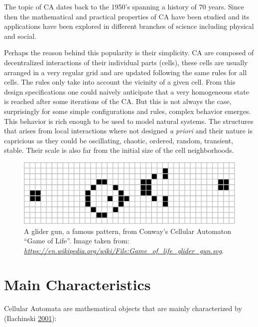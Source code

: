 \documentclass[
]{book}
\begin{document}
The topic of CA dates back to the 1950's spanning a history of 70 years. Since then the mathematical and practical properties of CA have been studied and its applications have been explored in different branches of science including physical and social.

Perhaps the reason behind this popularity is their simplicity. CA are composed of decentralized interactions of their individual parts (cells), these cells are usually arranged in a very regular grid and are updated following the same rules for all cells. The rules only take into account the vicinity of a given cell. From this design specifications one could naively anticipate that a very homogeneous state is reached after some iterations of the CA. But this is not always the case, surprisingly for some simple configurations and rules, complex behavior emerges. This behavior is rich enough to be used to model natural systems. The structures that arises from local interactions where not designed \emph{a priori} and their nature is capricious as they could be oscillating, chaotic, ordered, random, transient, stable. Their scale is also far from the initial size of the cell neighborhoods.



\begin{figure}

{\centering \includegraphics[width=0.8\linewidth]{pics/Game_of_life_glider_gun} 

}

\caption{A glider gun, a famous pattern, from Conway's Cellular Automaton ``Game of Life''. Image taken from: \emph{\url{https://en.wikipedia.org/wiki/File:Game_of_life_glider_gun.svg}}.}\label{fig:CA-example}
\end{figure}

\hypertarget{main-characteristics}{%
\section{Main Characteristics}\label{main-characteristics}}

Cellular Automata are mathematical objects that are mainly characterized by (Ilachinski \protect\hyperlink{ref-ilachinski2001cellular}{2001}):
\end{document}
